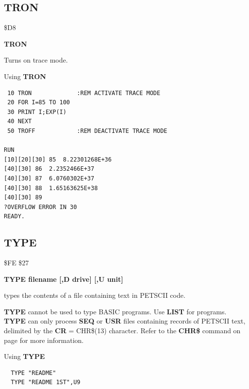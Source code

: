 
\newpage
\subsection{TRON}
\begin{description}[leftmargin=2cm,style=nextline]
\item [Token:] \$D8
\item [Format:] {\bf TRON}
\item [Usage:]  Turns on trace mode.

\item [Example:] Using {\bf TRON}
\begin{tcolorbox}[colback=black,coltext=white]
\verbatimfont{\codefont}
\begin{verbatim}
 10 TRON             :REM ACTIVATE TRACE MODE
 20 FOR I=85 TO 100
 30 PRINT I;EXP(I)
 40 NEXT
 50 TROFF            :REM DEACTIVATE TRACE MODE

RUN
[10][20][30] 85  8.22301268E+36
[40][30] 86  2.2352466E+37
[40][30] 87  6.0760302E+37
[40][30] 88  1.65163625E+38
[40][30] 89
?OVERFLOW ERROR IN 30
READY.
\end{verbatim}
\end{tcolorbox}
\end{description}


\newpage
\subsection{TYPE}
\begin{description}[leftmargin=2cm,style=nextline]
\item [Token:] \$FE \$27
\item [Format:] {\bf TYPE filename [,D drive] [,U unit] }
\item [Usage:] types the contents of a file containing
      text in PETSCII code.

   \filenamedefinition

   \drivedefinition

   \unitdefinition

\item [Remarks:] {\bf TYPE} cannot be used to type
                 BASIC programs. Use {\bf LIST} for programs.
                 {\bf TYPE} can only process {\bf SEQ} or {\bf USR} files
                 containing records of PETSCII text, delimited
                 by the {\bf CR} = CHR\$(13) character.
                 Refer to the {\bf CHR\$} command on page \pageref{chrcommand}
                 for more information.

\item [Example:] Using {\bf TYPE}
\begin{tcolorbox}[colback=black,coltext=white]
\verbatimfont{\codefont}
\begin{verbatim}
  TYPE "README"
  TYPE "README 1ST",U9
\end{verbatim}
\end{tcolorbox}
\end{description}

